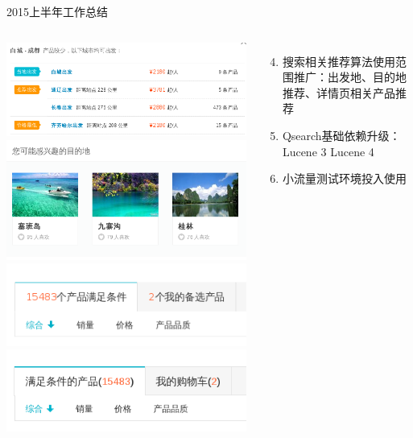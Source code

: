 \documentclass{beamer}
\begin{document}
\begin{CJK}{UTF8}{gbsn}
\begin{frame}{2015上半年工作总结}
  \begin{columns}
    \begin{center}
      \begin{minipage}[b]{1\textwidth}
         {
          \includegraphics[scale=0.2]{./images/dep-recommend}\\
          \includegraphics[scale=0.2]{./images/dest-recommend}
        }
         {
          \includegraphics[scale=0.4]{./images/a}\\
          \includegraphics[scale=0.4]{./images/b}
        }
      \end{minipage}
    \end{center}
    \begin{enumerate}\setcounter{enumi}{3}
      \item<2> 搜索相关推荐算法使用范围推广：出发地、目的地推荐、详情页相关产品推荐
      \item<3> Qsearch基础依赖升级：Lucene 3  Lucene 4
      \item<4> 小流量测试环境投入使用
    \end{enumerate}
  \end{columns}
\end{frame}



\end{CJK}
\end{document}
